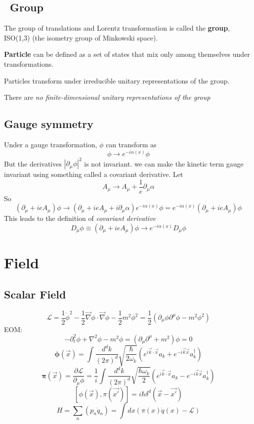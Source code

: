 \subsection{\Poincare \ Group} 
The group of translations and Lorentz transformation is called the
\textbf{\Poincare{} group}, 
ISO(1,3) (the isometry group of Minkowski space).

\textbf{Particle} can be defined as a set of states that mix only among
themselves under \Poincare{} transformations.

Particles transform under irreducible unitary representations of the
\Poincare{} group.

There are \emph{no finite-dimensional unitary representations of the
\Poincare{} group}

\subsection{Gauge symmetry}
Under a gauge transformation, $\phi$ can transform as 
\[
    \phi\rightarrow e^{-i\alpha(x)}\phi
    \]
But the derivatives $|\partial_\mu \phi|^2$ is not invariant. we can make
the kinetic term gauge invariant using something called a covariant
derivative. Let
\[
    A_\mu \rightarrow A_\mu + \frac{1}{e}\partial_\mu \alpha
    \]
So
\[
    (\partial_\mu+ieA_\mu)\phi\rightarrow(\partial_\mu+ieA_\mu+i\partial_\mu\alpha)e^{-i\alpha(x)}\phi=e^{-i\alpha(x)}(\partial_\mu+ieA_\mu)\phi
    \]
This leads to the definition of \emph{covariant derivative}
\[
    D_\mu\phi\equiv(\partial_\mu+ieA_\mu)\phi\rightarrow{e^{-i\alpha(x)}D_\mu\phi}
    \]
\section{Field}
\subsection{Scalar Field}
$$ \mathcal{L} = \frac{1}{2}\dot{\phi}^{2} -
\frac{1}{2}\vec{\nabla}\phi \cdot \vec{\nabla}\phi - \frac{1}{2}m^{2}\phi^{2} 
= \frac{1}{2}(\partial_{\mu}\phi\partial^{\mu}\phi - m^{2}\phi^{2})$$
EOM:
$$ -\partial_{t}^{2}\phi + \nabla^{2}\phi - m^{2}\phi =
(\partial_{\mu}\partial^{\mu} + m^{2}) \phi = 0 $$
$$ \pmb{\phi}(\vec{x}) = \int
\frac{d^{d}k}{(2\pi)^{d}}\sqrt{\frac{\hbar}{2\omega_{k}}}(e^{i\vec{k}\cdot\vec{x}}a_{k}+e^{-i\vec{k}\vec{x}}a_{k}^{\dag})$$
$$ \pmb{\pi}(\vec{x}) = \frac{\partial{\mathcal{L}}}{\partial_{\mu}\phi} =
\frac{1}{i} \int \frac{d^{d}k}{(2\pi)^{d}}\sqrt{\frac{\hbar\omega_{k}}{2}}(e^{i\vec{k}\cdot\vec{x}}a_{k}-e^{-i\vec{k}\vec{x}}a_{k}^{\dag}) $$
$$ [\phi(\vec{x}), \pi(\vec{x'})] = i\hbar\delta^{d}(\vec{x} - \vec{x'})$$
$$ H =\sum_{n}(p_{n}\dot{q}_n) = \int dx(\pi(x)\dot{q}(x) -
\mathcal{L})  $$


